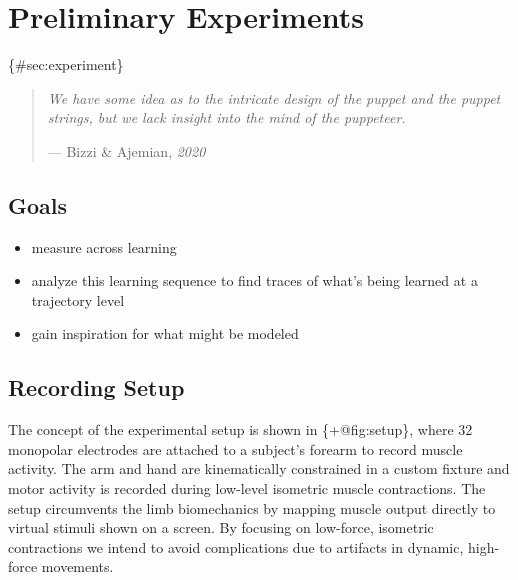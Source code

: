 \section{Preliminary Experiments}\label{preliminary-experiments}

\{\#sec:experiment\}

\begin{quote}
\emph{We have some idea as to the intricate design of the puppet and the
puppet strings, but we lack insight into the mind of the puppeteer.}

--- Bizzi \& Ajemian, \emph{2020}
\end{quote}

\subsection{Goals}\label{goals}

\begin{itemize}
\tightlist
\item
  measure across learning
\item
  analyze this learning sequence to find traces of what's being learned
  at a trajectory level
\item
  gain inspiration for what might be modeled
\end{itemize}

\subsection{Recording Setup}\label{recording-setup}

The concept of the experimental setup is shown in \{+@fig:setup\}, where
32 monopolar electrodes are attached to a subject's forearm to record
muscle activity. The arm and hand are kinematically constrained in a
custom fixture and motor activity is recorded during low-level isometric
muscle contractions. The setup circumvents the limb biomechanics by
mapping muscle output directly to virtual stimuli shown on a screen. By
focusing on low-force, isometric contractions we intend to avoid
complications due to artifacts in dynamic, high-force movements.

